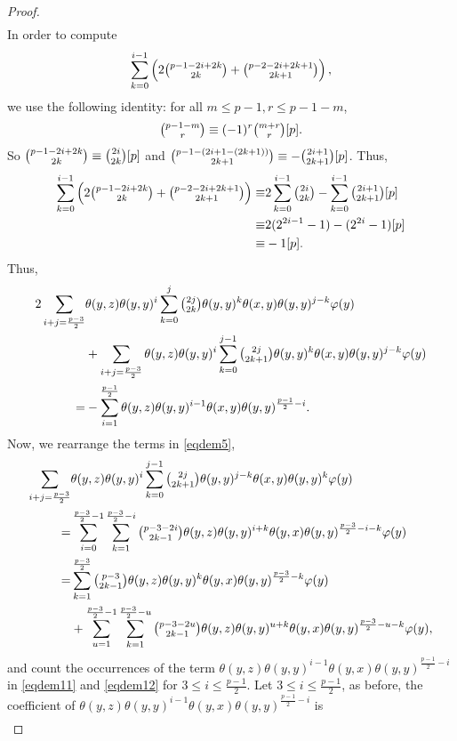 \documentclass[11pt, twoside]{article}
\begin{document}
\begin{proof}
\begin{align*}
    \end{align*} In order to compute $$\sum\limits_{k=0}^{i-1}\left(2\tbinom{p-1-2i+2k}{2k}+\tbinom{p-2-2i+2k+1}{2k+1}\right), $$ we use the following identity: for all $m\leq p-1, r\leq p-1-m $, $$\tbinom{p-1-m}{r}\equiv(-1)^r\tbinom{m+r}{r}[p]. $$ So $\tbinom{p-1-2i+2k}{2k}\equiv \tbinom{2i}{2k}[p] $ and $\tbinom{p-1-(2i+1-(2k+1))}{2k+1}\equiv-\tbinom{2i+1}{2k+1}[p] $. Thus, \begin{align*}
        \sum\limits_{k=0}^{i-1}\left(2\tbinom{p-1-2i+2k}{2k}+\tbinom{p-2-2i+2k+1}{2k+1}\right)\equiv &2\sum\limits_{k=0}^{i-1}\tbinom{2i}{2k}- \sum\limits_{k=0}^{i-1}\tbinom{2i+1}{2k+1}[p] \\ \equiv& 2(2^{2i-1}-1)-(2^{2i}-1)[p]\\ \equiv& -1[p]. 
    \end{align*} Thus, \begin{align*}
        2\sum\limits_{i+j=\frac{p-3}{2}}&\theta(y,z)\theta(y,y)^i\sum\limits_{k=0}^j\tbinom{2j}{2k}\theta(y,y)^k\theta(x,y)\theta(y,y)^{j-k}\varphi(y) \\& + \sum\limits_{i+j=\frac{p-3}{2}}\theta(y,z)\theta(y,y)^i\sum\limits_{k=0}^{j-1}\tbinom{2j}{2k+1}\theta(y,y)^k\theta(x,y)\theta(y,y)^{j-k}\varphi(y)\\ =& -\sum\limits_{i=1}^{\frac{p-1}{2}}\theta(y,z)\theta(y,y)^{i-1}\theta(x,y)\theta(y,y)^{\frac{p-1}{2}-i}.
    \end{align*}  Now, we rearrange the terms in \eqref{eqdem5}, \begin{align}
        \sum\limits_{i+j=\frac{p-3}{2}}&\theta(y,z)\theta(y,y)^i\sum\limits_{k=0}^{j-1}\tbinom{2j}{2k+1}\theta(y,y)^{j-k}\theta(x,y)\theta(y,y)^{k}\varphi(y) \notag\\ =& \sum\limits_{i=0}^{\frac{p-3}{2}-1}\sum\limits_{k=1}^{\frac{p-3}{2}-i}\tbinom{p-3-2i}{2k-1} \theta(y,z)\theta(y,y)^{i+k}\theta(y,x)\theta(y,y)^{\frac{p-3}{2}-i-k}\varphi(y)\notag\\ =& \sum\limits_{k=1}^\frac{p-3}{2}\tbinom{p-3}{2k-1}\theta(y,z)\theta(y,y)^k\theta(y,x)\theta(y,y)^{\frac{p-3}{2}-k}\varphi(y) \label{eqdem11}\\ &+ \sum\limits_{u=1}^{\frac{p-3}{2}-1}\sum\limits_{k=1}^{\frac{p-3}{2}-u}\tbinom{p-3-2u}{2k-1} \theta(y,z)\theta(y,y)^{u+k}\theta(y,x)\theta(y,y)^{\frac{p-3}{2}-u-k}\varphi(y),\label{eqdem12}
    \end{align} and count the occurrences of the term $\theta(y,z)\theta(y,y)^{i-1}\theta(y,x)\theta(y,y)^{\frac{p-1}{2}-i} $ in \eqref{eqdem11} and \eqref{eqdem12} for $3\leq i\leq \frac{p-1}{2}$. Let $3\leq i\leq \frac{p-1}{2}$, as before, the coefficient of $\theta(y,z)\theta(y,y)^{i-1}\theta(y,x)\theta(y,y)^{\frac{p-1}{2}-i} $ is \begin{align*}

\end{align*}
\end{proof}
\end{document}
